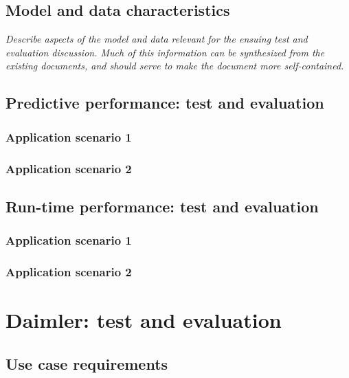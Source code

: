 \documentclass[11pt, oneside]{article}   	%
\numberwithin{figure}{section}
\numberwithin{equation}{section}
\numberwithin{table}{section}
\begin{document}
\subsection{Model and data characteristics}

\emph{Describe aspects of the model and data relevant for the ensuing test and evaluation discussion. Much of
  this information can be synthesized from the existing documents, and should serve to make the document more
  self-contained. }




\subsection{Predictive performance: test and evaluation}

\subsubsection{Application scenario 1}

\subsubsection{Application scenario 2}

\subsection{Run-time performance: test and evaluation}

\subsubsection{Application scenario 1}

\subsubsection{Application scenario 2}



\section{Daimler: test and evaluation}

\subsection{Use case requirements}
\end{document}
